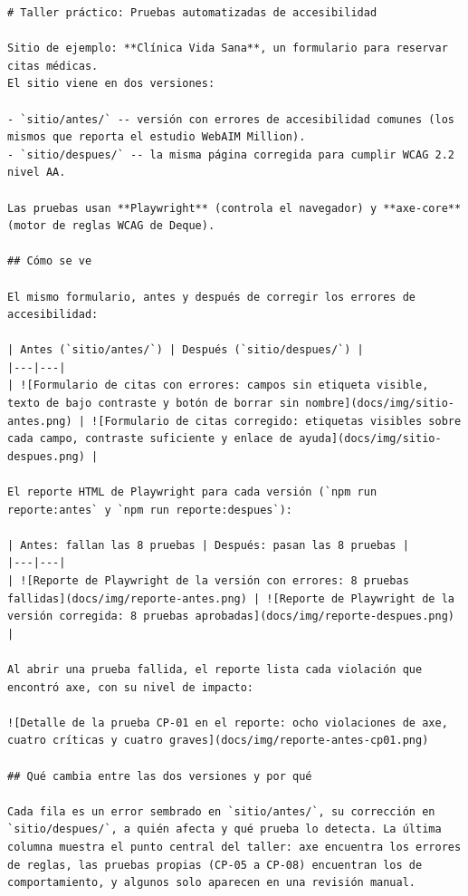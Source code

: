 \documentclass[10pt,letterpaper,onecolumn]{IEEEtran}
\begin{document}
\begin{lstlisting}
# Taller práctico: Pruebas automatizadas de accesibilidad

Sitio de ejemplo: **Clínica Vida Sana**, un formulario para reservar citas médicas.
El sitio viene en dos versiones:

- `sitio/antes/` -- versión con errores de accesibilidad comunes (los mismos que reporta el estudio WebAIM Million).
- `sitio/despues/` -- la misma página corregida para cumplir WCAG 2.2 nivel AA.

Las pruebas usan **Playwright** (controla el navegador) y **axe-core** (motor de reglas WCAG de Deque).

## Cómo se ve

El mismo formulario, antes y después de corregir los errores de accesibilidad:

| Antes (`sitio/antes/`) | Después (`sitio/despues/`) |
|---|---|
| ![Formulario de citas con errores: campos sin etiqueta visible, texto de bajo contraste y botón de borrar sin nombre](docs/img/sitio-antes.png) | ![Formulario de citas corregido: etiquetas visibles sobre cada campo, contraste suficiente y enlace de ayuda](docs/img/sitio-despues.png) |

El reporte HTML de Playwright para cada versión (`npm run reporte:antes` y `npm run reporte:despues`):

| Antes: fallan las 8 pruebas | Después: pasan las 8 pruebas |
|---|---|
| ![Reporte de Playwright de la versión con errores: 8 pruebas fallidas](docs/img/reporte-antes.png) | ![Reporte de Playwright de la versión corregida: 8 pruebas aprobadas](docs/img/reporte-despues.png) |

Al abrir una prueba fallida, el reporte lista cada violación que encontró axe, con su nivel de impacto:

![Detalle de la prueba CP-01 en el reporte: ocho violaciones de axe, cuatro críticas y cuatro graves](docs/img/reporte-antes-cp01.png)

## Qué cambia entre las dos versiones y por qué

Cada fila es un error sembrado en `sitio/antes/`, su corrección en `sitio/despues/`, a quién afecta y qué prueba lo detecta. La última columna muestra el punto central del taller: axe encuentra los errores de reglas, las pruebas propias (CP-05 a CP-08) encuentran los de comportamiento, y algunos solo aparecen en una revisión manual.


\end{lstlisting}
\end{document}
